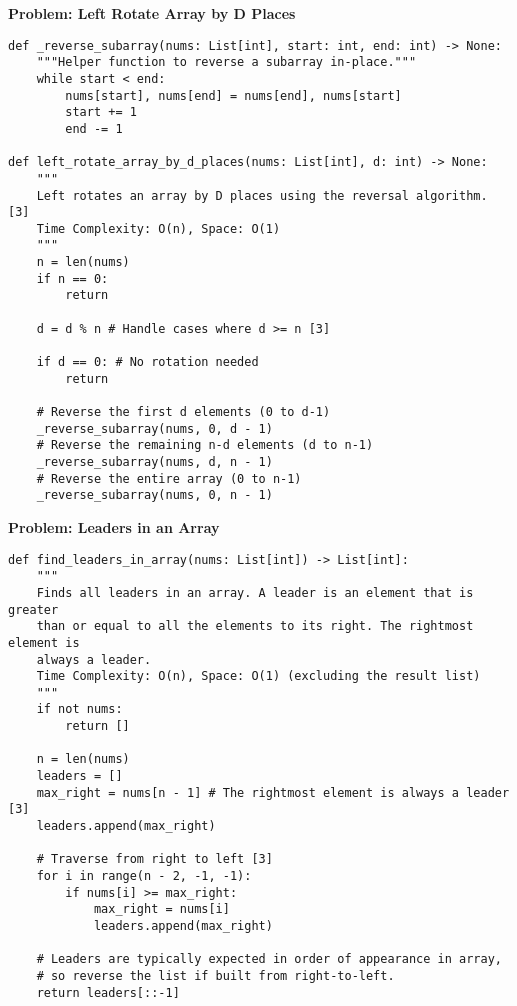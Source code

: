 \noindent\textbf{Problem: Left Rotate Array by D Places}
\begin{verbatim}
def _reverse_subarray(nums: List[int], start: int, end: int) -> None:
    """Helper function to reverse a subarray in-place."""
    while start < end:
        nums[start], nums[end] = nums[end], nums[start]
        start += 1
        end -= 1

def left_rotate_array_by_d_places(nums: List[int], d: int) -> None:
    """
    Left rotates an array by D places using the reversal algorithm. [3]
    Time Complexity: O(n), Space: O(1)
    """
    n = len(nums)
    if n == 0:
        return
    
    d = d % n # Handle cases where d >= n [3]

    if d == 0: # No rotation needed
        return

    # Reverse the first d elements (0 to d-1)
    _reverse_subarray(nums, 0, d - 1)
    # Reverse the remaining n-d elements (d to n-1)
    _reverse_subarray(nums, d, n - 1)
    # Reverse the entire array (0 to n-1)
    _reverse_subarray(nums, 0, n - 1)
\end{verbatim}

\noindent\textbf{Problem: Leaders in an Array}
\begin{verbatim}
def find_leaders_in_array(nums: List[int]) -> List[int]:
    """
    Finds all leaders in an array. A leader is an element that is greater
    than or equal to all the elements to its right. The rightmost element is
    always a leader.
    Time Complexity: O(n), Space: O(1) (excluding the result list)
    """
    if not nums:
        return []
    
    n = len(nums)
    leaders = []
    max_right = nums[n - 1] # The rightmost element is always a leader [3]
    leaders.append(max_right)

    # Traverse from right to left [3]
    for i in range(n - 2, -1, -1):
        if nums[i] >= max_right:
            max_right = nums[i]
            leaders.append(max_right)
    
    # Leaders are typically expected in order of appearance in array,
    # so reverse the list if built from right-to-left.
    return leaders[::-1]
\end{verbatim}

